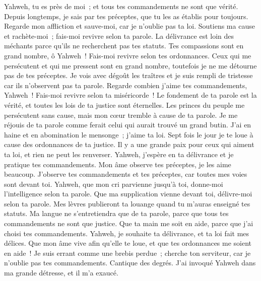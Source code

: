 \begin{multicols}{2}
Yahweh, tu es près de moi~; et tous tes commandements ne sont que vérité.
Depuis longtemps, je sais par tes préceptes, que tu les as établis pour toujours.
 Regarde mon affliction et sauve-moi, car je n'oublie pas ta loi.
Soutiens ma cause et rachète-moi~; fais-moi revivre selon ta parole.
La délivrance est loin des méchants parce qu'ils ne recherchent pas tes statuts.
Tes compassions sont en grand nombre, ô Yahweh~! Fais-moi revivre selon tes ordonnances.
Ceux qui me persécutent et qui me pressent sont en grand nombre, toutefois je ne me détourne pas de tes préceptes.
Je vois avec dégoût les traîtres et je suis rempli de tristesse car ils n'observent pas ta parole.
Regarde combien j'aime tes commandements, Yahweh~! Fais-moi revivre selon ta miséricorde~!
Le fondement de ta parole est la vérité, et toutes les lois de ta justice sont éternelles.
 Les princes du peuple me persécutent sans cause, mais mon cœur tremble à cause de ta parole.
Je me réjouis de ta parole comme ferait celui qui aurait trouvé un grand butin.
J'ai en haine et en abomination le mensonge~; j'aime ta loi.
Sept fois le jour je te loue à cause des ordonnances de ta justice.
Il y a une grande paix pour ceux qui aiment ta loi, et rien ne peut les renverser.
Yahweh, j'espère en ta délivrance et je pratique tes commandements.
Mon âme observe tes préceptes, je les aime beaucoup.
J'observe tes commandements et tes préceptes, car toutes mes voies sont devant toi.
 Yahweh, que mon cri parvienne jusqu'à toi, donne-moi l'intelligence selon ta parole.
Que ma supplication vienne devant toi, délivre-moi selon ta parole.
Mes lèvres publieront ta louange quand tu m'auras enseigné tes statuts.
Ma langue ne s'entretiendra que de ta parole, parce que tous tes commandements ne sont que justice.
Que ta main me soit en aide, parce que j'ai choisi tes commandements.
Yahweh, je souhaite ta délivrance, et ta loi fait mes délices.
Que mon âme vive afin qu'elle te loue, et que tes ordonnances me soient en aide~!
Je suis errant comme une brebis perdue~; cherche ton serviteur, car je n'oublie pas tes commandements.
\VerseOne{}Cantique des degrés. J'ai invoqué Yahweh dans ma grande détresse, et il m'a exaucé.

\end{multicols}
